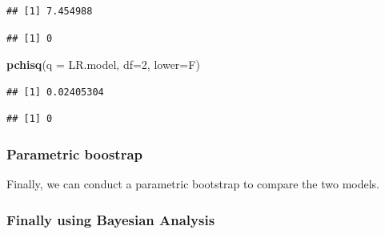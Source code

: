\documentclass[
]{article}
\newenvironment{Shaded}{\begin{snugshade}}{\end{snugshade}}
\newcommand{\DataTypeTok}[1]{\textcolor[rgb]{0.13,0.29,0.53}{#1}}
\newcommand{\DecValTok}[1]{\textcolor[rgb]{0.00,0.00,0.81}{#1}}
\newcommand{\KeywordTok}[1]{\textcolor[rgb]{0.13,0.29,0.53}{\textbf{#1}}}
\newcommand{\NormalTok}[1]{#1}
\newcommand{\OperatorTok}[1]{\textcolor[rgb]{0.81,0.36,0.00}{\textbf{#1}}}
\begin{document}
\begin{verbatim}
## [1] 7.454988
\end{verbatim}

\begin{Shaded}
\end{Shaded}

\begin{verbatim}
## [1] 0
\end{verbatim}

\begin{Shaded}
\begin{Highlighting}[]
\KeywordTok{pchisq}\NormalTok{(}\DataTypeTok{q =}\NormalTok{ LR.model, }\DataTypeTok{df=}\DecValTok{2}\NormalTok{, }\DataTypeTok{lower=}\NormalTok{F)}
\end{Highlighting}
\end{Shaded}

\begin{verbatim}
## [1] 0.02405304
\end{verbatim}

\begin{Shaded}
\end{Shaded}

\begin{verbatim}
## [1] 0
\end{verbatim}

\hypertarget{parametric-boostrap-2}{%
\subsubsection{Parametric boostrap}\label{parametric-boostrap-2}}

Finally, we can conduct a parametric bootstrap to compare the two
models.

\hypertarget{finally-using-bayesian-analysis-2}{%
\subsubsection{Finally using Bayesian
Analysis}\label{finally-using-bayesian-analysis-2}}
\end{document}
